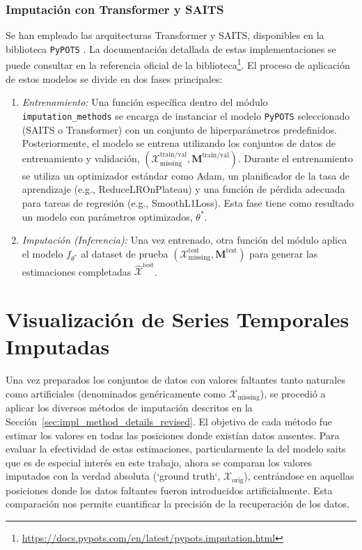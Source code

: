 \subsubsection*{Imputación con Transformer y SAITS}
Se han empleado las arquitecturas Transformer y SAITS, disponibles en la biblioteca \texttt{PyPOTS} \citep{du2023pypots}. La documentación detallada de estas implementaciones se puede consultar en la referencia oficial de la biblioteca\footnote{\url{https://docs.pypots.com/en/latest/pypots.imputation.html}}. El proceso de aplicación de estos modelos se divide en dos fases principales:
\begin{enumerate}
    \item \textit{Entrenamiento:} Una función específica dentro del módulo \texttt{imputation\_methods} se encarga de instanciar el modelo \texttt{PyPOTS} seleccionado (SAITS o Transformer) con un conjunto de hiperparámetros predefinidos. Posteriormente, el modelo se entrena utilizando los conjuntos de datos de entrenamiento y validación, $(\mathcal{X}_{\text{missing}}^{\text{train/val}}, \mathbf{M}^{\text{train/val}})$. Durante el entrenamiento se utiliza un optimizador estándar como Adam, un planificador de la tasa de aprendizaje (e.g., ReduceLROnPlateau) y una función de pérdida adecuada para tareas de regresión (e.g., SmoothL1Loss). Esta fase tiene como resultado un modelo con parámetros optimizados, $\theta^*$.
    \item \textit{Imputación (Inferencia):} Una vez entrenado, otra función del módulo aplica el modelo $f_{\theta^*}$ al dataset de prueba $(\mathcal{X}_{\text{missing}}^{\text{test}}, \mathbf{M}^{\text{test}})$ para generar las estimaciones completadas $\hat{\mathcal{X}}^{\text{test}}$.
\end{enumerate}

\section{Visualización de Series Temporales Imputadas}

Una vez preparados los conjuntos de datos con valores faltantes tanto naturales como artificiales (denominados genéricamente como $\mathcal{X}_{\text{missing}}$), se procedió a aplicar los diversos métodos de imputación descritos en la Sección~\ref{sec:impl_method_details_revised}. El objetivo de cada método fue estimar los valores en todas las posiciones donde existían datos ausentes. Para evaluar la efectividad de estas estimaciones, particularmente la del modelo \gls{saits} que es de especial interés en este trabajo, ahora se comparan los valores imputados con la verdad absoluta (`ground truth`, $\mathcal{X}_{\text{orig}}$), centrándose en aquellas posiciones donde los datos faltantes fueron introducidos artificialmente. Esta comparación nos permite cuantificar la precisión de la recuperación de los datos.

